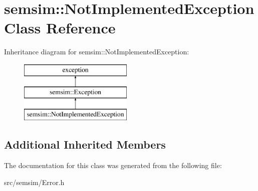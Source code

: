 \hypertarget{classsemsim_1_1NotImplementedException}{}\section{semsim\+:\+:Not\+Implemented\+Exception Class Reference}
\label{classsemsim_1_1NotImplementedException}
Inheritance diagram for semsim\+:\+:Not\+Implemented\+Exception\+:\begin{figure}[H]
\begin{center}
\leavevmode
\includegraphics[height=3.000000cm]{classsemsim_1_1NotImplementedException}
\end{center}
\end{figure}
\subsection*{Additional Inherited Members}


The documentation for this class was generated from the following file\+:\begin{DoxyCompactItemize}
\item 
src/semsim/Error.\+h\end{DoxyCompactItemize}
